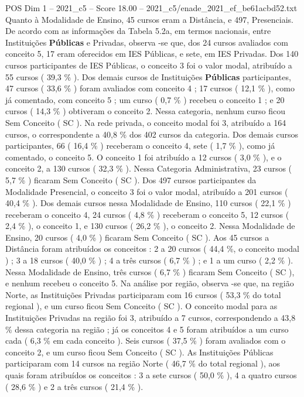 \begin{textsample}{POS Dim 1 – 2021\_c5 – Score 18.00 – 2021\_c5/enade\_2021\_ef\_be61acbd52.txt}
Quanto à Modalidade de Ensino, 45 cursos eram a Distância, e 497, Presenciais.
De acordo com as informações da Tabela 5.2a, em termos nacionais, entre Instituições \textbf{Públicas} e Privadas, observa -se que, dos 24 cursos avaliados com conceito 5, 17 eram oferecidos em IES Públicas, e sete, em IES Privadas.
Dos 140 cursos participantes de IES Públicas, o conceito 3 foi o valor modal, atribuído a 55 cursos ( 39,3 \% ).
Dos demais cursos de Instituições \textbf{Públicas} participantes, 47 cursos ( 33,6 \% ) foram avaliados com conceito 4 ; 17 cursos ( 12,1 \% ), como já comentado, com conceito 5 ; um curso ( 0,7 \% ) recebeu o conceito 1 ; e 20 cursos ( 14,3 \% ) obtiveram o conceito 2.
Nessa categoria, nenhum curso ficou Sem Conceito ( SC ).
Na rede privada, o conceito modal foi 3, atribuído a 164 cursos, o correspondente a 40,8 \% dos 402 cursos da categoria.
Dos demais cursos participantes, 66 ( 16,4 \% ) receberam o conceito 4, sete ( 1,7 \% ), como já comentado, o conceito 5.
O conceito 1 foi atribuído a 12 cursos ( 3,0 \% ), e o conceito 2, a 130 cursos ( 32,3 \% ).
Nessa Categoria Administrativa, 23 cursos ( 5,7 \% ) ficaram Sem Conceito ( SC ).
Dos 497 cursos participantes da Modalidade Presencial, o conceito 3 foi o valor modal, atribuído a 201 cursos ( 40,4 \% ).
Dos demais cursos nessa Modalidade de Ensino, 110 cursos ( 22,1 \% ) receberam o conceito 4, 24 cursos ( 4,8 \% ) receberam o conceito 5, 12 cursos ( 2,4 \% ), o conceito 1, e 130 cursos ( 26,2 \% ), o conceito 2.
Nessa Modalidade de Ensino, 20 cursos ( 4,0 \% ) ficaram Sem Conceito ( SC ).
Aos 45 cursos a Distância foram atribuídos os conceitos : 2 a 20 cursos ( 44,4 \%, o conceito modal ) ; 3 a 18 cursos ( 40,0 \% ) ; 4 a três cursos ( 6,7 \% ) ; e 1 a um curso ( 2,2 \% ).
Nessa Modalidade de Ensino, três cursos ( 6,7 \% ) ficaram Sem Conceito ( SC ), e nenhum recebeu o conceito 5.
Na análise por região, observa -se que, na região Norte, as Instituições Privadas participaram com 16 cursos ( 53,3 \% do total regional ), e um curso ficou Sem Conceito ( SC ).
O conceito modal para as Instituições Privadas na região foi 3, atribuído a 7 cursos, correspondendo a 43,8 \% dessa categoria na região ; já os conceitos 4 e 5 foram atribuídos a um curso cada ( 6,3 \% em cada conceito ).
Seis cursos ( 37,5 \% ) foram avaliados com o conceito 2, e um curso ficou Sem Conceito ( SC ).
As Instituições Públicas participaram com 14 cursos na região Norte ( 46,7 \% do total regional ), aos quais foram atribuídos os conceitos : 3 a sete cursos ( 50,0 \% ), 4 a quatro cursos ( 28,6 \% ) e 2 a três cursos ( 21,4 \% ).

\end{textsample}
